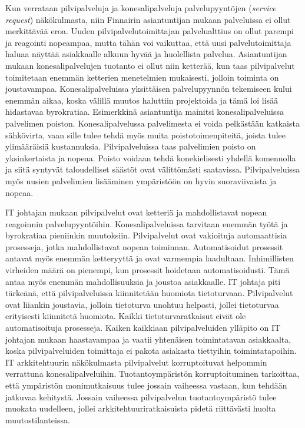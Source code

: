 Kun verrataan pilvipalveluja ja konesalipalveluja palvelupyyntöjen (\emph{service request}) näkökulmasta, niin Finnairin asiantuntijan mukaan palveluissa ei ollut merkittävää eroa. Uuden pilvipalvelutoimittajan palvelualttius on ollut parempi ja reagointi nopeampaa, mutta tähän voi vaikuttaa, että uusi palvelutoimittaja haluaa näyttää asiakkaalle alkuun hyvää ja huolellista palvelua. Asiantuntijan mukaan konesalipalvelujen tuotanto ei ollut niin ketterää, kun taas pilvipalvelut toimitetaan enemmän ketterien menetelmien mukaisesti, jolloin toiminta on joustavampaa. Konesalipalveluissa yksittäisen palvelupyynnön tekemiseen kului enemmän aikaa, koska välillä muutos haluttiin projektoida ja tämä loi lisää hidastavaa byrokratiaa. Esimerkkinä asiantuntija mainitsi konesalipalveluissa palvelimen poiston. Konesalipalvelussa palvelimesta ei voida pelkästään katkaista sähkövirta, vaan sille tulee tehdä myös muita poistotoimenpiteitä, joista tulee ylimääräisiä kustannuksia. Pilvipalveluissa taas palvelimien poisto on yksinkertaista ja nopeaa. Poisto voidaan tehdä konekielisesti yhdellä komennolla ja siitä syntyvät taloudelliset säästöt ovat välittömästi saatavissa. Pilvipalveluissa myös uusien palvelimien lisääminen ympäristöön on hyvin suoraviivaista ja nopeaa.

IT johtajan mukaan pilvipalvelut ovat ketteriä ja mahdollistavat nopean reagoinnin palvelupyyntöihin. Konesalipalveluissa tarvitaan enemmän työtä ja byrokratiaa pieniinkin muutoksiin. Pilvipalvelut ovat vakioituja automaattisia prosesseja, jotka mahdollistavat nopean toiminnan. Automatisoidut prosessit antavat myös enemmän ketteryyttä ja ovat varmempia laadultaan. Inhimillisten virheiden määrä on pienempi, kun prosessit hoidetaan automatisoidusti. Tämä antaa myös enemmän mahdollisuuksia ja joustoa asiakkaalle. IT johtaja piti tärkeänä, että pilvipalveluissa kiinnitetään huomiota tietoturvaan. Pilvipalvelut ovat liiankin joustavia, jolloin tietoturva unohtuu helposti, jollei tietoturvaa erityisesti kiinnitetä huomiota. Kaikki tietoturvaratkaisut eivät ole automatisoituja prosesseja. Kaiken kaikkiaan pilvipalveluiden ylläpito on IT johtajan mukaan haastavampaa ja vaatii yhtenäisen toimintatavan asiakkaalta, koska pilvipalveluiden toimittaja ei pakota asiakasta tiettyihin toimintatapoihin. IT arkkitehtuurin näkökulmasta pilvipalvelut korruptoituvat helpommin verrattuna konesalipalveluihin. Tuotantoympäristön korruptoituminen tarkoittaa, että ympäristön monimutkaisuus tulee jossain vaiheessa vastaan, kun tehdään jatkuvaa kehitystä. Jossain vaiheessa pilvipalvelun tuotantoympäristö tulee muokata uudelleen, jollei arkkitehtuuriratkaisuista pidetä riittävästi huolta muutostilanteissa.

